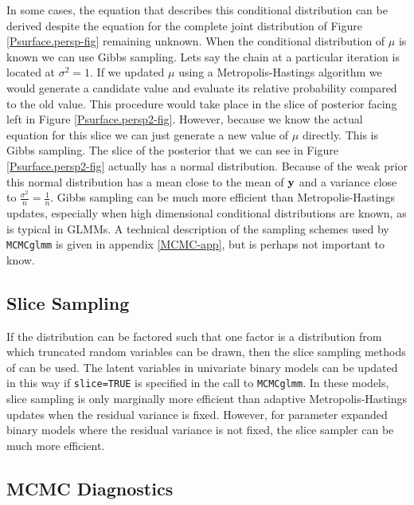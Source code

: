 \documentclass{article}
\begin{document}
 In some cases, the equation that describes this conditional distribution can be derived despite the equation for the complete joint distribution of Figure \ref{Psurface.persp-fig} remaining unknown.  When the conditional distribution of $\mu$ is known we can use Gibbs sampling. Lets say the chain at a particular iteration is located at $\sigma^{2}=1$.  If we updated $\mu$ using a Metropolis-Hastings algorithm we would generate a candidate value and evaluate its relative probability compared to the old value.  This procedure would take place in the slice of posterior facing left in Figure \ref{Psurface.persp2-fig}. However, because we know the actual equation for this slice we can just generate a new value of $\mu$ directly. This is Gibbs sampling.  The slice of the posterior that we can see in Figure \ref{Psurface.persp2-fig} actually has a normal distribution. Because of the weak prior this normal distribution has a mean close to the mean of $\bf{y}$ and a variance close to $\frac{\sigma^{2}}{n} = \frac{1}{n}$.  Gibbs sampling can be much more efficient than Metropolis-Hastings updates, especially when high dimensional conditional distributions are known, as is typical in GLMMs. A technical description of the sampling schemes used by \texttt{MCMCglmm} is given in appendix \ref{MCMC-app}, but is perhaps not important to know.

\subsection{Slice Sampling}

If the distribution can be factored such that one factor is a distribution from which truncated random variables can be drawn, then the slice sampling methods of \citet{Damien.1999} can be used. The latent variables in univariate binary models can be updated in this way if \texttt{slice=TRUE} is specified in the call to \texttt{MCMCglmm}. In these models, slice sampling is only marginally more efficient than adaptive Metropolis-Hastings updates when the residual variance is fixed. However, for parameter expanded binary models where the residual variance is not fixed, the slice sampler can be much more efficient.

\subsection{MCMC Diagnostics}
\end{document}
